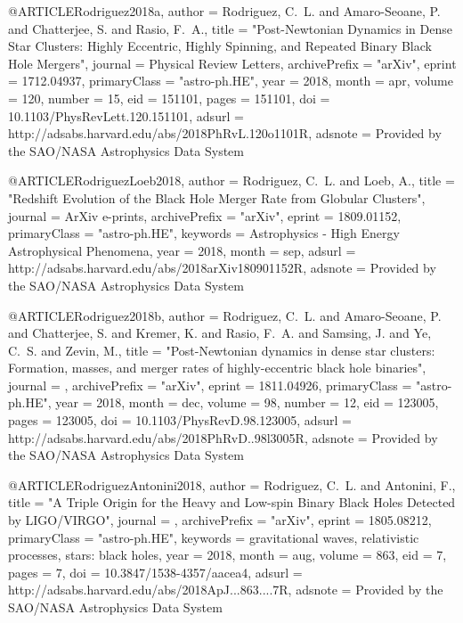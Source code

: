 \documentclass[twocolumn,tighten]{aastex63}
\begin{document}
{{{{{{{@ARTICLE{Rodriguez2018a,
   author = {{Rodriguez}, C.~L. and {Amaro-Seoane}, P. and {Chatterjee}, S. and 
	{Rasio}, F.~A.},
    title = "{Post-Newtonian Dynamics in Dense Star Clusters: Highly Eccentric, Highly Spinning, and Repeated Binary Black Hole Mergers}",
  journal = {Physical Review Letters},
archivePrefix = "arXiv",
   eprint = {1712.04937},
 primaryClass = "astro-ph.HE",
     year = 2018,
    month = apr,
   volume = 120,
   number = 15,
      eid = {151101},
    pages = {151101},
      doi = {10.1103/PhysRevLett.120.151101},
   adsurl = {http://adsabs.harvard.edu/abs/2018PhRvL.120o1101R},
  adsnote = {Provided by the SAO/NASA Astrophysics Data System}
}

@ARTICLE{RodriguezLoeb2018,
   author = {{Rodriguez}, C.~L. and {Loeb}, A.},
    title = "{Redshift Evolution of the Black Hole Merger Rate from Globular Clusters}",
  journal = {ArXiv e-prints},
archivePrefix = "arXiv",
   eprint = {1809.01152},
 primaryClass = "astro-ph.HE",
 keywords = {Astrophysics - High Energy Astrophysical Phenomena},
     year = 2018,
    month = sep,
   adsurl = {http://adsabs.harvard.edu/abs/2018arXiv180901152R},
  adsnote = {Provided by the SAO/NASA Astrophysics Data System}
}

@ARTICLE{Rodriguez2018b,
   author = {{Rodriguez}, C.~L. and {Amaro-Seoane}, P. and {Chatterjee}, S. and 
	{Kremer}, K. and {Rasio}, F.~A. and {Samsing}, J. and {Ye}, C.~S. and 
	{Zevin}, M.},
    title = "{Post-Newtonian dynamics in dense star clusters: Formation, masses, and merger rates of highly-eccentric black hole binaries}",
  journal = {\prd},
archivePrefix = "arXiv",
   eprint = {1811.04926},
 primaryClass = "astro-ph.HE",
     year = 2018,
    month = dec,
   volume = 98,
   number = 12,
      eid = {123005},
    pages = {123005},
      doi = {10.1103/PhysRevD.98.123005},
   adsurl = {http://adsabs.harvard.edu/abs/2018PhRvD..98l3005R},
  adsnote = {Provided by the SAO/NASA Astrophysics Data System}
}}

@ARTICLE{RodriguezAntonini2018,
   author = {{Rodriguez}, C.~L. and {Antonini}, F.},
    title = "{A Triple Origin for the Heavy and Low-spin Binary Black Holes Detected by LIGO/VIRGO}",
  journal = {\apj},
archivePrefix = "arXiv",
   eprint = {1805.08212},
 primaryClass = "astro-ph.HE",
 keywords = {gravitational waves, relativistic processes, stars: black holes},
     year = 2018,
    month = aug,
   volume = 863,
      eid = {7},
    pages = {7},
      doi = {10.3847/1538-4357/aacea4},
   adsurl = {http://adsabs.harvard.edu/abs/2018ApJ...863....7R},
  adsnote = {Provided by the SAO/NASA Astrophysics Data System}
}

}}}}}}
\end{document}
